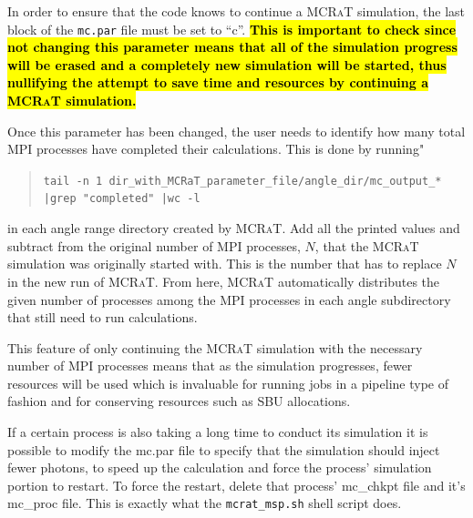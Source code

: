 \documentclass[12pt,a4paper]{article}
\newcommand{\mcrat}{\textsc{MCRaT}}
\begin{document}
 In order to ensure that the code knows to continue a \mcrat{} simulation, the last block of the \texttt{mc.par} file must be set to ``c''. \hl{\bf This is important to check since not changing this parameter means that all of the simulation progress will be erased and a completely new simulation will be started, thus nullifying the attempt to save time and resources by continuing a \mcrat{} simulation.} 
 
Once this parameter has been changed, the user needs to identify how many total MPI processes have completed their calculations. This is done by running"
 \begin{quotation}
\texttt{tail -n 1 dir\_with\_MCRaT\_parameter\_file/angle\_dir/mc\_output\_* |grep "completed" |wc -l}
 \end{quotation}
in each angle range directory created by \mcrat{}. Add all the printed values and subtract from the original number of MPI processes, $N$, that the \mcrat{} simulation was originally started with. This is the number that has to replace $N$ in the new run of \mcrat{}. From here, \mcrat{} automatically distributes the given number of processes among the MPI processes in each angle subdirectory that still need to run calculations.
 
 This feature of only continuing the \mcrat{} simulation with the necessary number of MPI processes means that as the simulation progresses, fewer resources will be used which is invaluable for running jobs in a pipeline type of fashion and for conserving resources such as SBU allocations.
 
 If a certain process is also taking a long time to conduct its simulation it is possible to modify the mc.par file to specify that the simulation should inject fewer photons, to speed up the calculation and force the process' simulation portion to restart. To force the restart, delete that process' mc\_chkpt file and it's  mc\_proc file. This is exactly what the \texttt{mcrat\_msp.sh} shell script does. 
 
\end{document}
